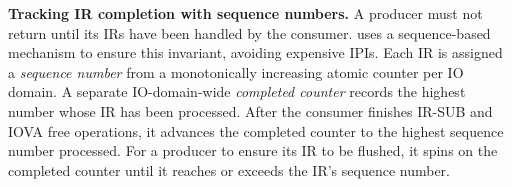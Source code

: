 


{\bf Tracking IR completion with sequence numbers.}
A producer must not return 
    until its IRs have been handled by the consumer.
    \vfreebrand uses a sequence-based mechanism to ensure this invariant,
     avoiding expensive IPIs.
Each IR is assigned a \emph{sequence number} from a monotonically increasing atomic counter per IO domain.
A separate IO-domain-wide \emph{completed counter} records the highest number whose IR has been processed.
After the consumer finishes IR-SUB and IOVA free operations,
    it advances the completed counter to the highest sequence number processed.
For a producer to ensure its IR to be flushed,
    it spins on the completed counter until it reaches or exceeds the IR's sequence number.


